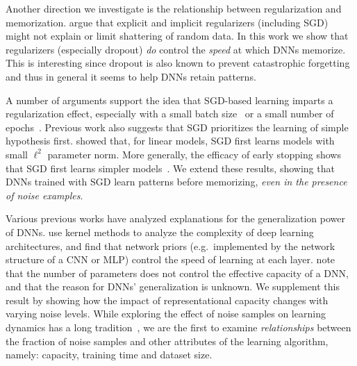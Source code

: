 \documentclass{article}
\begin{document}
Another direction we investigate is the relationship between regularization and memorization. 
\citet{understanding_DL} argue that explicit and implicit regularizers (including SGD) might not explain or limit shattering of random data. 
In this work we show that regularizers (especially dropout) {\it do} control the \emph{speed} at which DNNs memorize. This is interesting since dropout is also known to prevent catastrophic forgetting \cite{goodfellow2013empirical} and thus in general it seems to help DNNs retain patterns.

A number of arguments support the idea that SGD-based learning imparts a regularization effect, especially with a small batch size~\citep{wilson2003general} or a small number of epochs~\citep{hardt2015train}.
Previous work also suggests that SGD prioritizes the learning of simple hypothesis first. 
\citet{CIS-125961} showed that, for linear models, SGD first learns models with small $\ell^2$ parameter norm.
More generally, the efficacy of early stopping shows that SGD first learns simpler models~\citep{yao2007early}. 
We extend these results, showing that DNNs trained with SGD learn patterns before memorizing, {\it even in the presence of noise examples}. 

Various previous works have analyzed explanations for the generalization power of DNNs.
\citet{Montavon2011} use kernel methods to analyze the complexity of deep learning architectures, and find that network priors (e.g.~implemented by the network structure of a CNN or MLP) control the speed of learning at each layer. 
\citet{neyshabur2014search} note that the number of parameters does not control the effective capacity of a DNN, and that the reason for DNNs' generalization is unknown. 
We supplement this result by showing how the impact of representational capacity changes with varying noise levels. %
While exploring the effect of noise samples on learning dynamics has a long tradition~\citep{bishop1995training, an1996effects}, we are the first to examine {\it relationships} between the fraction of noise samples and other attributes of the learning algorithm, namely: capacity, training time and dataset size.
\end{document}

